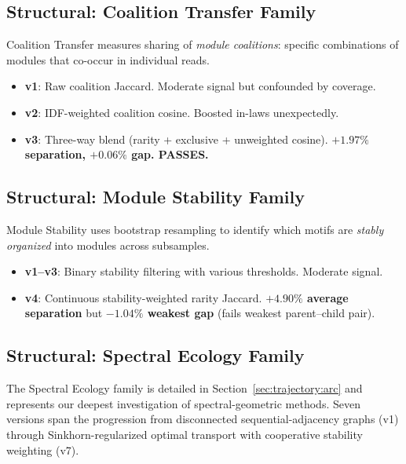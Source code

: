 \documentclass{../yalumba}
\begin{document}
\subsection{Structural: Coalition Transfer Family}

Coalition Transfer measures sharing of \emph{module coalitions}:
specific combinations of modules that co-occur in individual reads.

\begin{itemize}
  \item \textbf{v1}: Raw coalition Jaccard.  Moderate signal but
    confounded by coverage.
  \item \textbf{v2}: IDF-weighted coalition cosine.  Boosted in-laws
    unexpectedly.
  \item \textbf{v3}: Three-way blend (rarity + exclusive + unweighted
    cosine).  \textbf{$+1.97\%$ separation, $+0.06\%$ gap.  PASSES.}
\end{itemize}

\subsection{Structural: Module Stability Family}

Module Stability uses bootstrap resampling to identify which motifs
are \emph{stably organized} into modules across subsamples.

\begin{itemize}
  \item \textbf{v1--v3}: Binary stability filtering with various
    thresholds.  Moderate signal.
  \item \textbf{v4}: Continuous stability-weighted rarity Jaccard.
    \textbf{$+4.90\%$ average separation} but \textbf{$-1.04\%$ weakest
    gap} (fails weakest parent--child pair).
\end{itemize}

\subsection{Structural: Spectral Ecology Family}

The Spectral Ecology family is detailed in
Section~\ref{sec:trajectory:arc} and represents our deepest
investigation of spectral-geometric methods.  Seven versions span the
progression from disconnected sequential-adjacency graphs (v1) through
Sinkhorn-regularized optimal transport with cooperative stability
weighting (v7).


\end{document}
